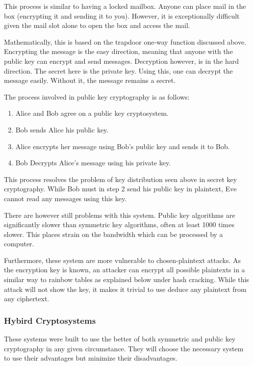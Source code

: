 				This process is similar to having a locked mailbox.
				Anyone can place mail in the box (encrypting it and sending it to you).
				However, it is exceptionally difficult given the mail slot alone to open the box and access the mail.

				Mathematically, this is based on the trapdoor one-way function discussed above.
				Encrypting the message is the easy direction, meaning that anyone with the public key can encrypt and send messages.
				Decryption however, is in the hard direction.
				The secret here is the private key.
				Using this, one can decrypt the message easily.
				Without it, the message remains a secret.

				The process involved in public key cryptography is as follows:
				\begin{enumerate}
					\item Alice and Bob agree on a public key cryptosystem.
					\item Bob sends Alice his public key.
					\item Alice encrypts her message using Bob's public key and sends it to Bob.
					\item Bob Decrypts Alice's message using his private key.
				\end{enumerate}

				This process resolves the problem of key distribution seen above in secret key cryptography.
				While Bob must in step 2 send his public key in plaintext, Eve cannot read any messages using this key.

				There are however still problems with this system.
				Public key algorithms are significantly slower than symmetric key algorithms, often at least 1000 times slower.
				This places strain on the bandwidth which can be processed by a computer.

				Furthermore, these system are more vulnerable to chosen-plaintext attacks.
				As the encryption key is known, an attacker can encrypt all possible plaintexts in a similar way to rainbow tables as explained below under hash cracking.
				While this attack will not show the key, it makes it trivial to use deduce any plaintext from any ciphertext.

			\subsubsection{Hybird Cryptosystems}
				These systems were built to use the better of both symmetric and public key cryptography in any given circumstance.
				They will choose the necessary system to use their advantages but minimize their disadvantages.


